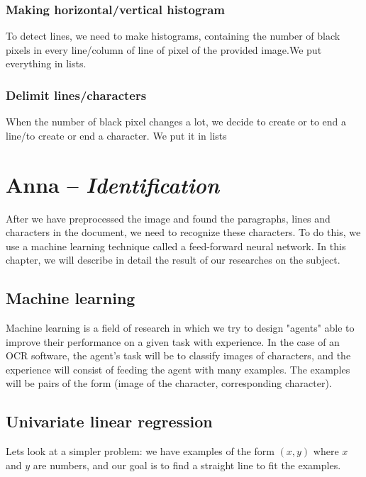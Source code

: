 \documentclass[12pt]{report}
\begin{document}
\subsection{Making horizontal/vertical histogram}

To detect lines, we need to make histograms, containing the number of black pixels in every line/column of line of pixel of the provided image.We put everything in lists.

\subsection{Delimit lines/characters}

When the number of black pixel changes a lot, we decide to create or to end a line/to create or end a character. We put it in lists

\chapter{Anna -- \emph{Identification}}

After we have preprocessed the image and found the paragraphs, lines and characters in the document, we need to recognize these characters. To do this, we use a machine learning technique called a feed-forward neural network. In this chapter, we will describe in detail the result of our researches on the subject.

\section{Machine learning}

Machine learning is a field of research in which we try to design "agents" able
to improve their performance on a given task with experience. In the case of an
OCR software, the agent's task will be to classify images of characters, and the
experience will consist of feeding the agent with many examples. The examples
will be pairs of the form (image of the character, corresponding character).

\section{Univariate linear regression}

Lets look at a simpler problem: we have examples of the form $(x, y)$ where $x$
and $y$ are numbers, and our goal is to find a straight line to fit the
examples.\\
\end{document}
